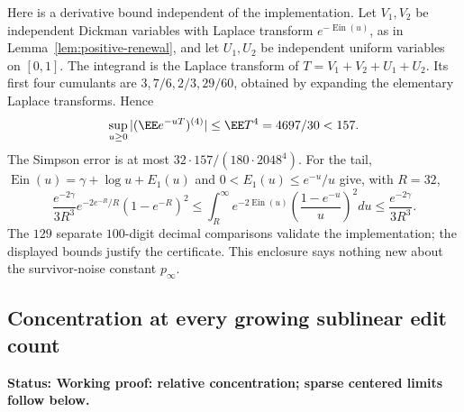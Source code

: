\documentclass[11pt,letterpaper]{article}
\newcommand{\status}[1]{\textbf{Status: #1.}}
\begin{document}
Here is a derivative bound independent of the implementation.
Let $V_1,V_2$ be independent Dickman variables with Laplace transform
$e^{-\operatorname{Ein}(u)}$, as in
Lemma~\ref{lem:positive-renewal}, and let $U_1,U_2$ be independent
uniform variables on $[0,1]$. The integrand is the Laplace transform
of $T=V_1+V_2+U_1+U_2$. Its first four cumulants are
$3,7/6,2/3,29/60$, obtained by expanding the elementary Laplace
transforms. Hence
\[
 \sup_{u\ge0}|(\EE e^{-uT})^{(4)}|
     \le\EE T^4=4697/30<157.
\]
The Simpson error is at most $32\cdot157/(180\cdot2048^4)$.
For the tail, $\operatorname{Ein}(u)=\gamma+\log u+E_1(u)$ and
$0<E_1(u)\le e^{-u}/u$ give, with $R=32$,
\[
 \frac{e^{-2\gamma}}{3R^3}
      e^{-2e^{-R}/R}(1-e^{-R})^2
 \le\int_R^\infty e^{-2\operatorname{Ein}(u)}
                   \left(\frac{1-e^{-u}}u\right)^2du
 \le\frac{e^{-2\gamma}}{3R^3}.
\]
The $129$ separate $100$-digit decimal comparisons validate the
implementation; the displayed bounds justify the certificate.
This enclosure says nothing new about the survivor-noise constant
$p_\infty$.

\subsection{Concentration at every growing sublinear edit count}
\label{sec:history-concentration}

\status{Working proof: relative concentration; sparse centered limits follow below}
\end{document}
